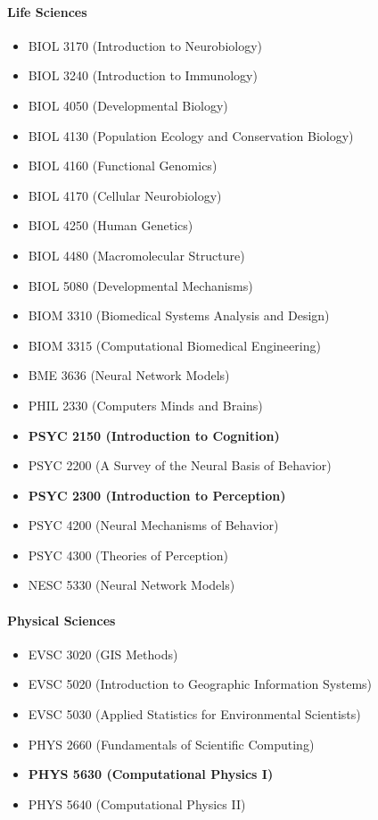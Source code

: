 \documentclass[10pt,letter]{book}
\newenvironment{itemlist}{
\begin{itemize}
\setlength{\itemsep}{0pt}
\setlength{\parskip}{0pt}}
{\end{itemize}}
\begin{document}
\paragraph{Life Sciences}
\begin{itemlist}
\item BIOL 3170 (Introduction to Neurobiology)
\item BIOL 3240 (Introduction to Immunology)
\item BIOL 4050 (Developmental Biology)
\item BIOL 4130 (Population Ecology and Conservation Biology)
\item BIOL 4160 (Functional Genomics)
\item BIOL 4170 (Cellular Neurobiology)
\item BIOL 4250 (Human Genetics)
\item BIOL 4480 (Macromolecular Structure)
\item BIOL 5080 (Developmental Mechanisms)
\item BIOM 3310 (Biomedical Systems Analysis and Design)
\item BIOM 3315 (Computational Biomedical Engineering)
\item BME 3636 (Neural Network Models)
\item PHIL 2330 (Computers Minds and Brains)
\item {\bf PSYC 2150 (Introduction to Cognition)}
\item PSYC 2200 (A Survey of the Neural Basis of Behavior)
\item {\bf PSYC 2300 (Introduction to Perception)}
\item PSYC 4200 (Neural Mechanisms of Behavior)
\item PSYC 4300 (Theories of Perception)
\item NESC 5330 (Neural Network Models)
\end{itemlist}

\paragraph{Physical Sciences}
\begin{itemlist}
\item EVSC 3020 (GIS Methods)
\item EVSC 5020 (Introduction to Geographic Information Systems)
\item EVSC 5030 (Applied Statistics for Environmental Scientists)
\item PHYS 2660 (Fundamentals of Scientific Computing)
\item {\bf PHYS 5630 (Computational Physics I)}
\item PHYS 5640 (Computational Physics II)
\end{itemlist}
\end{document}
